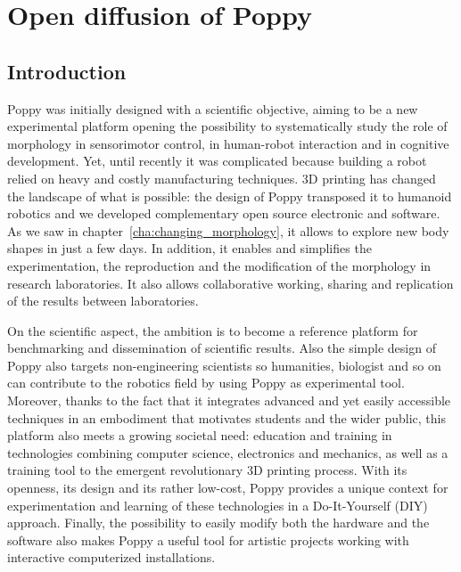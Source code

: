
\cleartoleftpage


\chapter{Open diffusion of Poppy} %
\label{cha:diffusion}

\section{Introduction} %

Poppy was initially designed with a scientific objective, aiming to be a new experimental platform opening the possibility to systematically study the role of morphology in sensorimotor control, in human-robot interaction and in cognitive development. Yet, until recently it was complicated because building a robot relied on heavy and costly manufacturing techniques. 3D printing has changed the landscape of what is possible: the design of Poppy transposed it to humanoid robotics and we developed complementary open source electronic and software. As we saw in chapter~\ref{cha:changing_morphology}, it allows to explore new body shapes in just a few days.
In addition, it enables and simplifies the experimentation, the reproduction and the modification of the morphology in research laboratories. It also allows collaborative working, sharing and replication of the results between laboratories.

On the scientific aspect, the ambition is to become a reference platform for benchmarking and dissemination of scientific results. Also the simple design of Poppy also targets non-engineering scientists so humanities, biologist and so on can contribute to the robotics field by using Poppy as experimental tool.
Moreover, thanks to the fact that it integrates advanced and yet easily accessible techniques in an embodiment that motivates students and the wider public, this platform also meets a growing societal need: education and training in technologies combining computer science, electronics and mechanics, as well as a training tool to the emergent revolutionary 3D printing process. With its openness, its design and its rather low-cost, Poppy provides a unique context for experimentation and learning of these technologies in a Do-It-Yourself (DIY) approach.
Finally, the possibility to easily modify both the hardware and the software also makes Poppy a useful tool for artistic projects working with interactive computerized installations.

